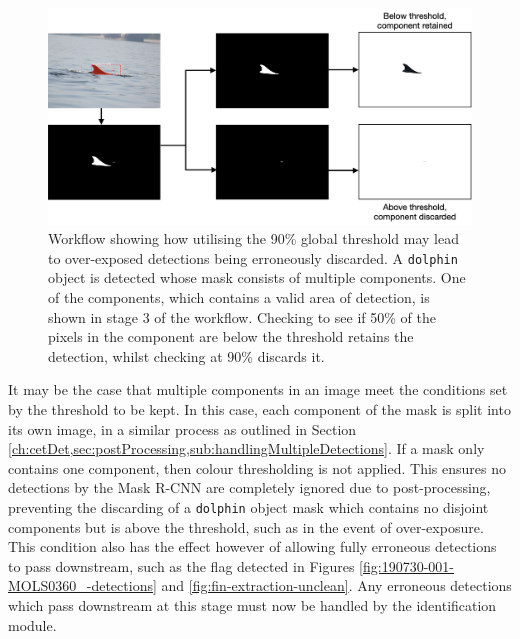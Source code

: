 \begin{figure}
	\begin{center}
		\includegraphics[width=\linewidth]{Chapter3/figs/190723-001-MOLS0752_-fin-removed-at-90-kept-at-50.png}
	\end{center}
	\caption[Workflow showing how utilising the 90\% global threshold may lead to over-exposed detections being erroneously discarded.]{Workflow showing how utilising the 90\% global threshold may lead to over-exposed detections being erroneously discarded. A \texttt{dolphin} object is detected whose mask consists of multiple components.  One of the components, which contains a valid area of detection, is shown in stage 3 of the workflow. Checking to see if 50\% of the pixels in the component are below the threshold retains the detection, whilst checking at 90\% discards it.}\label{fig:190723-001-MOLS0752_-fin-removed-at-90-kept-at-50}
\end{figure}

It may be the case that multiple components in an image meet the conditions set by the threshold to be kept. In this case, each component of the mask is split into its own image, in a similar process as outlined in Section \ref{ch:cetDet,sec:postProcessing,sub:handlingMultipleDetections}. If a mask only contains one component, then colour thresholding is not applied. This ensures no detections by the Mask R-CNN are completely ignored due to post-processing, preventing the discarding of a \texttt{dolphin} object mask which contains no disjoint components but is above the threshold, such as in the event of over-exposure. This condition also has the effect however of allowing fully erroneous detections to pass downstream, such as the flag detected in Figures \ref{fig:190730-001-MOLS0360_-detections} and \ref{fig:fin-extraction-unclean}. Any erroneous detections which pass downstream at this stage must now be handled by the identification module.

